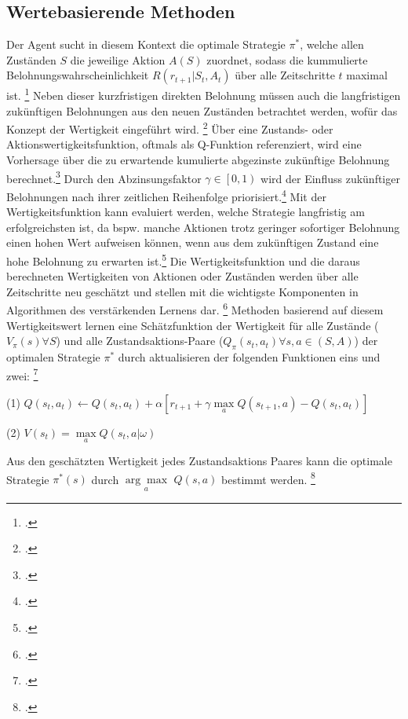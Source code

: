 \subsection{Wertebasierende Methoden}
Der Agent sucht in diesem Kontext die optimale Strategie $\pi^{*}$, welche allen Zuständen $S$ die jeweilige Aktion $A(S)$ zuordnet, sodass die kummulierte Belohnungswahrscheinlichkeit $R(r_{t+1}|S_{t},A_{t})$ über alle Zeitschritte $t$ maximal ist. \footcite[Vgl.][S. 2]{Reda.2020}
Neben dieser kurzfristigen direkten Belohnung müssen auch die langfristigen zukünftigen Belohnungen aus den neuen Zuständen betrachtet werden, wofür das Konzept der Wertigkeit eingeführt wird. \footcite[Vgl.][S. 3]{Wang.2020}
Über eine Zustands- oder Aktionswertigkeitsfunktion, oftmals als Q-Funktion referenziert, wird eine Vorhersage über die zu erwartende kumulierte abgezinste zukünftige Belohnung berechnet.\footcite[Vgl.][S. 5]{Li.2019}
Durch den Abzinsungsfaktor $\gamma \in \left[0,1\right)$ wird der Einfluss zukünftiger Belohnungen nach ihrer zeitlichen Reihenfolge priorisiert.\footcite[Vgl][S. 5]{Li.2019}
Mit der Wertigkeitsfunktion kann evaluiert werden, welche Strategie langfristig am erfolgreichsten ist, da bspw. manche Aktionen trotz geringer sofortiger Belohnung einen hohen Wert aufweisen können, wenn aus dem zukünftigen Zustand eine hohe Belohnung zu erwarten ist.\footcite[Vgl.][S. 6]{Sutton.2018}
Die Wertigkeitsfunktion und die daraus berechneten Wertigkeiten von Aktionen oder Zuständen werden über alle Zeitschritte neu geschätzt und stellen mit die wichtigste Komponenten in Algorithmen des verstärkenden Lernens dar. \footcite[Vgl.][S. 6f.]{Sutton.2018}
Methoden basierend auf diesem Wertigkeitswert lernen eine Schätzfunktion der Wertigkeit für alle Zustände ($V_{\pi}(s) \forall S$) und alle Zustandsaktions-Paare ($Q_{\pi}(s_{t},a_{t}) \forall s,a \in (S,A)$) der optimalen Strategie $\pi^{*}$ durch aktualisieren der folgenden Funktionen eins und zwei: \footcite[Vgl.][S. 2]{Zhang.2018}
\begin{description}
    \item \begin{center} (1) $Q(s_{t}, a_{t}) \leftarrow Q(s_{t}, a_{t}) + \alpha\left[r_{t+1} + \gamma\max\limits_{a}Q(s_{t+1},a)-Q(s_{t},a_{t})\right]$ \end{center}
    \item \begin{center} (2) $V(s_{t}) = \max\limits_{a}Q(s_{t},a|\omega)$ \end{center}
\end{description}
Aus den geschätzten Wertigkeit jedes Zustandsaktions Paares kann die optimale Strategie $\pi^{*}(s)$ durch $\underset{a}{\arg\max}$ $Q(s,a)$ bestimmt werden. \footcite[Vgl.][S. 2]{Zhang.2018}


